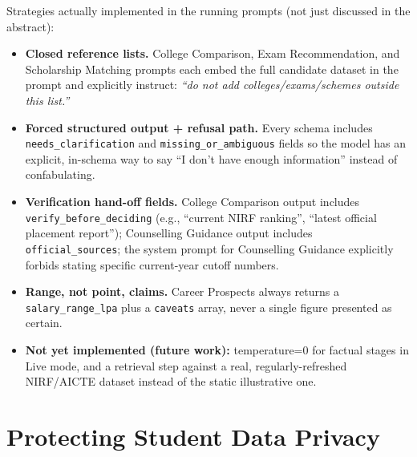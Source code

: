 \documentclass[11pt]{article}
\begin{document}
Strategies actually implemented in the running prompts (not just discussed in the abstract):
\begin{itemize}
\item \textbf{Closed reference lists.} College Comparison, Exam Recommendation, and Scholarship Matching prompts each embed the full candidate dataset in the prompt and explicitly instruct: \emph{``do not add colleges/exams/schemes outside this list.''}
\item \textbf{Forced structured output + refusal path.} Every schema includes \texttt{needs\_clarification} and \texttt{missing\_or\_ambiguous} fields so the model has an explicit, in-schema way to say ``I don't have enough information'' instead of confabulating.
\item \textbf{Verification hand-off fields.} College Comparison output includes \texttt{verify\_before\_deciding} (e.g., ``current NIRF ranking'', ``latest official placement report''); Counselling Guidance output includes \texttt{official\_sources}; the system prompt for Counselling Guidance explicitly forbids stating specific current-year cutoff numbers.
\item \textbf{Range, not point, claims.} Career Prospects always returns a \texttt{salary\_range\_lpa} plus a \texttt{caveats} array, never a single figure presented as certain.
\item \textbf{Not yet implemented (future work):} temperature=0 for factual stages in Live mode, and a retrieval step against a real, regularly-refreshed NIRF/AICTE dataset instead of the static illustrative one.
\end{itemize}

\section{Protecting Student Data Privacy}
\label{sec:privacy}
\end{document}
